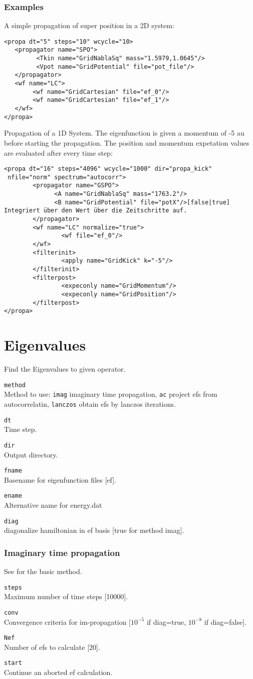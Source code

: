 \documentclass[a4paper,12pt]{scrbook}
\newcommand{\option}[2]{\item \texttt{#1}\\ #2}
\newcommand{\code}[1]{\texttt{#1}}
\begin{document}
\subsubsection*{Examples}
A simple propagation of super position in a 2D system:
\begin{verbatim}
<propa dt="5" steps="10" wcycle="10>
   <propagator name="SPO">
         <Tkin name="GridNablaSq" mass="1.5979,1.0645"/>
         <Vpot name="GridPotential" file="pot_file"/>
   </propagator>
   <wf name="LC">
        <wf name="GridCartesian" file="ef_0"/>
        <wf name="GridCartesian" file="ef_1"/>
   </wf>
</propa> 
\end{verbatim}

Propagation of a 1D System. The eigenfunction is given a momentum of -5 au before starting the
propagation. The position and momentum expetation values are evaluated after every time step:
\begin{verbatim}
<propa dt="16" steps="4096" wcycle="1000" dir="propa_kick"
 nfile="norm" spectrum="autocorr">
        <propagator name="GSPO">
              <A name="GridNablaSq" mass="1763.2"/>
              <B name="GridPotential" file="potX"/>[false|true] Integriert über den Wert über die Zeitschritte auf.
        </propagator>
        <wf name="LC" normalize="true">
                <wf file="ef_0"/>
        </wf>
        <filterinit>
                <apply name="GridKick" k="-5"/>
        </filterinit>
        <filterpost>
                <expeconly name="GridMomentum"/>
                <expeconly name="GridPosition"/>
        </filterpost>
</propa> 
\end{verbatim}


\section{Eigenvalues}
Find the Eigenvalues to given operator.

\begin{options}
\option{method}{Method to use: \code{imag} imaginary time propagation, \code{ac} project efs from autocorrelatin, \code{lanczos} obtain efs by lanczos iterations.}
\option{dt}{Time step.}
\option{dir}{Output directory.}
\option{fname}{Basename for eigenfunction files [ef].}
\option{ename}{Alternative name for energy.dat}
\option{diag}{diagonalize hamiltonian in ef basis [true for method imag].}
\end{options}

\subsubsection*{Imaginary time propagation}
See \cite{Ezer86} for the basic method.
\begin{options}
\option{steps}{Maximum number of time steps [10000].}
\option{conv}{Convergence criteria for im-propagation [$10^{-5}$ if diag=true, $10^{-8}$ if diag=false].}
\option{Nef}{Number of efs to calculate [20].}
\option{start}{Continue an aborted ef calculation.}
\end{options}
\end{document}
